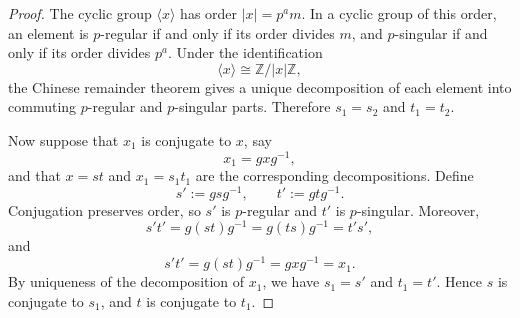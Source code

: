 \begin{proof}
    The cyclic group \(\langle x\rangle\) has order \(|x|=p^a m\). In a cyclic group of
    this order, an element is \(p\)-regular if and only if its order divides \(m\), and
    \(p\)-singular if and only if its order divides \(p^a\). Under the identification
    \[
        \langle x\rangle \cong \mathbb{Z}/|x|\mathbb{Z},
    \]
    the Chinese remainder theorem gives a unique decomposition of each element into
    commuting \(p\)-regular and \(p\)-singular parts. Therefore \(s_1=s_2\) and
    \(t_1=t_2\).

    Now suppose that \(x_1\) is conjugate to \(x\), say
    \[
        x_1=gxg^{-1},
    \]
    and that \(x=st\) and \(x_1=s_1t_1\) are the corresponding decompositions. Define
    \[
        s':=gsg^{-1},
        \qquad
        t':=gtg^{-1}.
    \]
    Conjugation preserves order, so \(s'\) is \(p\)-regular and \(t'\) is
    \(p\)-singular. Moreover,
    \[
        s't'
        =
        g(st)g^{-1}
        =
        g(ts)g^{-1}
        =
        t's',
    \]
    and
    \[
        s't'
        =
        g(st)g^{-1}
        =
        gxg^{-1}
        =
        x_1.
    \]
    By uniqueness of the decomposition of \(x_1\), we have \(s_1=s'\) and
    \(t_1=t'\). Hence \(s\) is conjugate to \(s_1\), and \(t\) is conjugate to \(t_1\).
\end{proof}
